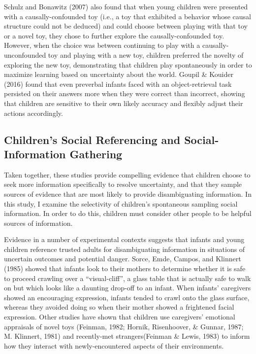 \documentclass[floatsintext,man]{apa6}
\theoremstyle{definition}
\theoremstyle{definition}
\theoremstyle{definition}
\theoremstyle{remark}
\begin{document}
Schulz and Bonawitz (2007) also found that when young children were
presented with a causally-confounded toy (i.e., a toy that exhibited a
behavior whose causal structure could not be deduced) and could choose
between playing with that toy or a novel toy, they chose to further
explore the causally-confounded toy. However, when the choice was
between continuing to play with a causally-unconfounded toy and playing
with a new toy, children preferred the novelty of exploring the new toy,
demonstrating that children play spontaneously in order to maximize
learning based on uncertainty about the world. Goupil \& Kouider (2016)
found that even preverbal infants faced with an object-retrieval task
persisted on their answers more when they were correct than incorrect,
showing that children are sensitive to their own likely accuracy and
flexibly adjust their actions accordingly.

\subsection{Children's Social Referencing and Social-Information
Gathering}\label{childrens-social-referencing-and-social-information-gathering}

Taken together, these studies provide compelling evidence that children
choose to seek more information specifically to resolve uncertainty, and
that they sample sources of evidence that are most likely to provide
disambiguating information. In this study, I examine the selectivity of
children's spontaneous sampling social information. In order to do this,
children must consider other people to be helpful sources of
information.

Evidence in a number of experimental contexts suggests that infants and
young children reference trusted adults for disambiguating information
in situations of uncertain outcomes and potential danger. Sorce, Emde,
Campos, and Klinnert (1985) showed that infants look to their mothers to
determine whether it is safe to proceed crawling over a
\enquote{visual-cliff}, a glass table that is actually safe to walk on
but which looks like a daunting drop-off to an infant. When infants'
caregivers showed an encouraging expression, infants tended to crawl
onto the glass surface, whereas they avoided doing so when their mother
showed a frightened facial expression. Other studies have shown that
children use caregivers' emotional appraisals of novel toys (Feinman,
1982; Hornik, Risenhoover, \& Gunnar, 1987; M. Klinnert, 1981) and
recently-met strangers(Feinman \& Lewis, 1983) to inform how they
interact with newly-encountered aspects of their environments.
\end{document}
